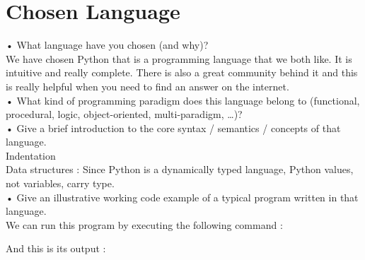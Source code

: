 \section{Chosen Language}
•	What language have you chosen (and why)?\\
We have chosen Python that is a programming language that we both like. It is intuitive and really complete. There is also a great community behind it and this is really helpful when you need to find an answer on the internet.\\
•	What kind of programming paradigm does this language belong to (functional, procedural, logic, object-oriented, multi-paradigm, …)?\\
•	Give a brief introduction to the core syntax / semantics / concepts of that language.\\
Indentation\\
Data structures : Since Python is a dynamically typed language, Python values, not variables, carry type.\\
•	Give an illustrative working code example of a typical program written in that language.\\



We can run this program by executing the following command :



And this is its output :

